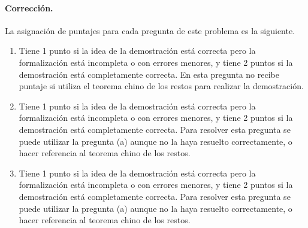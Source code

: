\paragraph{Corrección.} La asignación de puntajes para cada pregunta de este problema es la siguiente.
\begin{enumerate}
      \item Tiene 1 punto si la idea de la demostración está correcta pero la formalización está incompleta o con errores menores, y tiene 2 puntos si la demostración está completamente correcta. En esta pregunta no recibe puntaje si utiliza el teorema chino de los restos para realizar la demostración. 

      \item Tiene 1 punto si la idea de la demostración está correcta pero la formalización está incompleta o con errores menores, y tiene 2 puntos si la demostración está completamente correcta. Para resolver esta pregunta se puede utilizar la pregunta (a) aunque no la haya resuelto correctamente, o hacer referencia al teorema chino de los restos.

\item Tiene 1 punto si la idea de la demostración está correcta pero la formalización está incompleta o con errores menores, y tiene 2 puntos si la demostración está completamente correcta. Para resolver esta pregunta se puede utilizar la pregunta (a) aunque no la haya resuelto correctamente, o hacer referencia al teorema chino de los restos. 
\end{enumerate}


